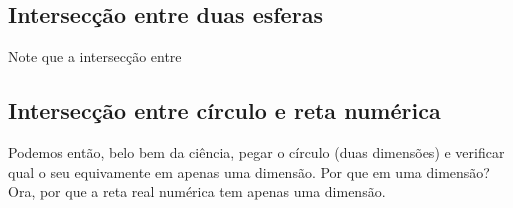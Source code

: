 \subsection{Intersecção entre duas esferas}
Note que a intersecção entre 

\subsection{Intersecção entre círculo e reta numérica}
Podemos então, belo bem da ciência, pegar o círculo (duas dimensões) e verificar qual o seu equivamente em apenas uma dimensão. Por que em uma dimensão? Ora, por que a reta real numérica tem apenas uma dimensão.